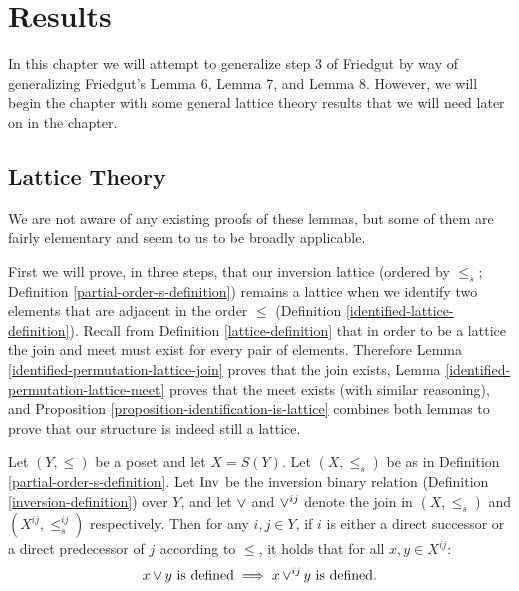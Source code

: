 
\chapter{Results}

	In this chapter we will attempt to generalize step 3 of Friedgut by way of generalizing Friedgut's Lemma 6, Lemma 7, and Lemma 8. However, we will begin the chapter with some general lattice theory results that we will need later on in the chapter.

\section{Lattice Theory}

	We are not aware of any existing proofs of these lemmas, but some of them are fairly elementary and seem to us to be broadly applicable.

	First we will prove, in three steps, that our inversion lattice (ordered by $\le_s$; Definition \ref{partial-order-s-definition}) remains a lattice when we identify two elements that are adjacent in the order $\le$ (Definition \ref{identified-lattice-definition}). Recall from Definition \ref{lattice-definition} that in order to be a lattice the join and meet must exist for every pair of elements. Therefore Lemma \ref{identified-permutation-lattice-join} proves that the join exists, Lemma \ref{identified-permutation-lattice-meet} proves that the meet exists (with similar reasoning), and Proposition \ref{proposition-identification-is-lattice} combines both lemmas to prove that our structure is indeed still a lattice.

	\begin{lemma}
		\label{identified-permutation-lattice-join}
		Let $(Y, \le)$ be a poset and let $X = S(Y)$. Let $(X, \le_s)$ be as in Definition \ref{partial-order-s-definition}. Let $\operatorname{Inv}$ be the inversion binary relation (Definition \ref{inversion-definition}) over $Y$, and let $\operatorname{\vee}$ and $\operatorname{\vee}^{ij}$ denote the join in $(X, \le_s)$ and $(X^{ij}, \le^{ij}_s)$ respectively. Then for any $i,j \in Y$, if $i$ is either a direct successor or a direct predecessor of $j$ according to $\le$, it holds that for all $x, y \in X^{ij}$:
		\[
			x \operatorname{\vee} y \text{ is defined} \implies x \operatorname{\vee}^{ij} y \text{ is defined}.
		\]
	\end{lemma}

